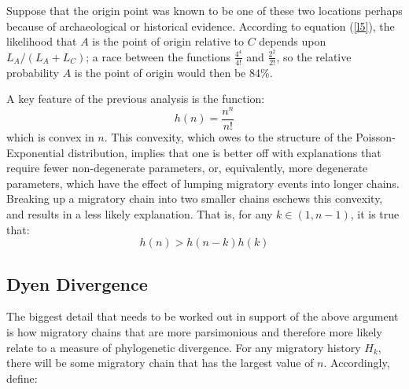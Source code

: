\documentclass[11pt]{article}
\begin{document}
Suppose that the origin point was known to be one of these two locations perhaps because of archaeological or historical evidence. According to equation (\ref{l5}), the likelihood that $A$ is the point of origin relative to $C$ depends upon $L_{A} /(L_A+L_C)$; a race between the functions $\frac{4^4}{4!}$ and $\frac{2^2}{2!}$, so the relative probability  $A$ is the point of origin would then be 84\%. 

A key feature of the previous analysis is the function: 
\begin{equation*}
h(n)=\frac{n^n}{n!}
\end{equation*}
which is convex in $n$. This convexity, which owes to the structure of the Poisson-Exponential distribution, implies that one is better off with explanations that require fewer non-degenerate parameters, or, equivalently, more degenerate parameters, which have the effect of lumping migratory events into longer chains. Breaking up a migratory chain into two smaller chains eschews this convexity, and results in a less likely explanation. That is, for any  $k \in (1,n-1)$, it is true that:
\begin{equation*}
h(n) > h(n-k)h(k)
\end{equation*} 

\subsection{Dyen Divergence}
The biggest detail that needs to be worked out in support of the above argument is how migratory chains that are more parsimonious and therefore more likely relate to a measure of phylogenetic divergence. For any migratory history $H_k$, there will be some migratory chain that has the largest value of $n$. Accordingly, define:
\end{document}
